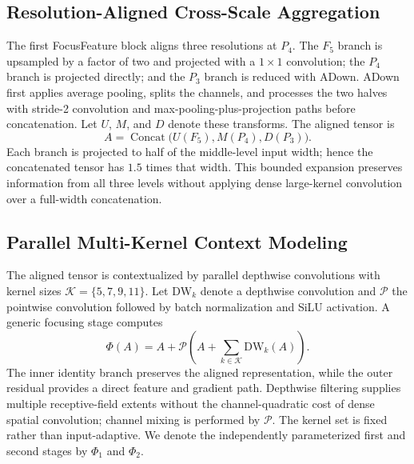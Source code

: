 \documentclass[journal]{IEEEtran}
\begin{document}
\subsection{Resolution-Aligned Cross-Scale Aggregation}
The first FocusFeature block aligns three resolutions at $P_4$. The $F_5$ branch is upsampled by a factor of two and projected with a $1\times1$ convolution; the $P_4$ branch is projected directly; and the $P_3$ branch is reduced with ADown. ADown first applies average pooling, splits the channels, and processes the two halves with stride-2 convolution and max-pooling-plus-projection paths before concatenation. Let $U$, $M$, and $D$ denote these transforms. The aligned tensor is
\begin{equation}
A=\operatorname{Concat}\bigl(U(F_5),M(P_4),D(P_3)\bigr).
\label{eq:align}
\end{equation}
Each branch is projected to half of the middle-level input width; hence the concatenated tensor has $1.5$ times that width. This bounded expansion preserves information from all three levels without applying dense large-kernel convolution over a full-width concatenation.

\subsection{Parallel Multi-Kernel Context Modeling}
The aligned tensor is contextualized by parallel depthwise convolutions with kernel sizes $\mathcal{K}=\{5,7,9,11\}$. Let $\mathrm{DW}_k$ denote a depthwise convolution and $\mathcal{P}$ the pointwise convolution followed by batch normalization and SiLU activation. A generic focusing stage computes
\begin{equation}
\Phi(A)=A+\mathcal{P}\!\left(A+\sum_{k\in\mathcal{K}}\mathrm{DW}_k(A)\right).
\label{eq:focus}
\end{equation}
The inner identity branch preserves the aligned representation, while the outer residual provides a direct feature and gradient path. Depthwise filtering supplies multiple receptive-field extents without the channel-quadratic cost of dense spatial convolution; channel mixing is performed by $\mathcal{P}$. The kernel set is fixed rather than input-adaptive. We denote the independently parameterized first and second stages by $\Phi_1$ and $\Phi_2$.
\end{document}
